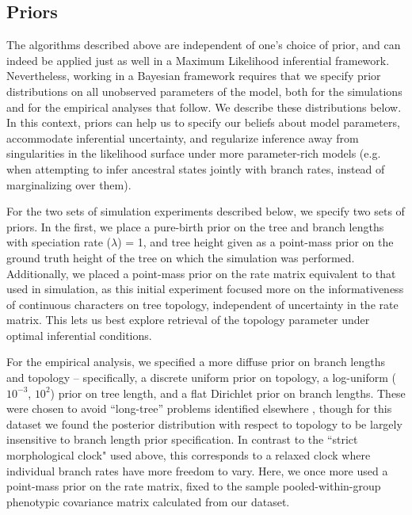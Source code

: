 \subsection{Priors}

The algorithms described above are independent of one's choice of prior, and can indeed be applied just as well in a Maximum Likelihood inferential framework. Nevertheless, working in a Bayesian framework requires that we specify prior distributions on all unobserved parameters of the model, both for the simulations and for the empirical analyses that follow. We describe these distributions below. In this context, priors can help us to specify our beliefs about model parameters, accommodate inferential uncertainty, and regularize inference away from singularities in the likelihood surface under more parameter-rich models (e.g. when attempting to infer ancestral states jointly with branch rates, instead of marginalizing over them).

For the two sets of simulation experiments described below, we specify two sets of priors. In the first, we place a pure-birth \citep{yuleMathematicalTheoryEvolution1925} prior on the tree and branch lengths with speciation rate ($\lambda$) = 1, and tree height given as a point-mass prior on the ground truth height of the tree on which the simulation was performed. Additionally, we placed a point-mass prior on the rate matrix equivalent to that used in simulation, as this initial experiment focused more on the informativeness of continuous characters on tree topology, independent of uncertainty in the rate matrix. This lets us best explore retrieval of the topology parameter under optimal inferential conditions.

For the empirical analysis, we specified a more diffuse prior on branch lengths and topology – specifically, a discrete uniform prior on topology, a log-uniform ($10^{-3}$, $10^2$) prior on tree length, and a flat Dirichlet prior on branch lengths. These were chosen to avoid “long-tree” problems identified elsewhere \citep{brownWhenTreesGrow2009}, though for this dataset we found the posterior distribution with respect to topology to be largely insensitive to branch length prior specification. In contrast to the ``strict morphological clock" used above, this corresponds to a relaxed clock where individual branch rates have more freedom to vary. Here, we once more used a point-mass prior on the rate matrix, fixed to the sample pooled-within-group phenotypic covariance matrix calculated from our dataset. 

